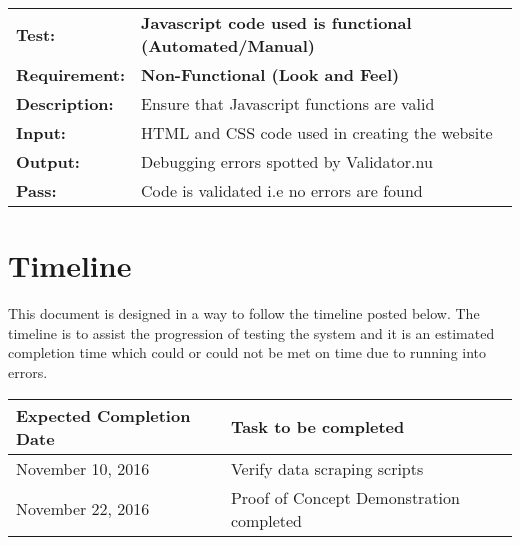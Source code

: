 \documentclass{article}
\begin{document}
	\begin{mdframed}[linewidth=1pt]
	\begin{tabularx}{\textwidth}{@{}p{3cm}X@{}}
	{\bf Test:} & {\bf Javascript code used is functional (Automated/Manual)}\\[\baselineskip]
	{\bf Requirement:} & {\bf Non-Functional (Look and Feel)}\\[\baselineskip]
	{\bf Description:} & Ensure that Javascript functions are valid \\[0.5\baselineskip]
	{\bf Input:} & HTML and CSS code used in creating the website \\[0.5\baselineskip]
	{\bf Output:} & Debugging errors spotted by Validator.nu \\[0.5\baselineskip]
	{\bf Pass:} & Code is validated i.e no errors are found
	\end{tabularx}
	\end{mdframed}




	\newpage
	
	\section{Timeline}
	This document is designed in a way to follow the timeline posted below. The timeline is to assist the progression of testing the system and it is an estimated 		completion time which could or could not be met on time due to running into errors. \\

		
		\begin{tabular}{|p{5cm}|p{5cm}|}
		\hline
		\textbf{Expected Completion Date}  & \textbf{Task to be completed} \\ \hline
		November 10, 2016 & Verify data scraping scripts \\ 
		November 22, 2016 & Proof of Concept Demonstration completed\\
		\hline
		\end{tabular}
		




	
\end{document}
